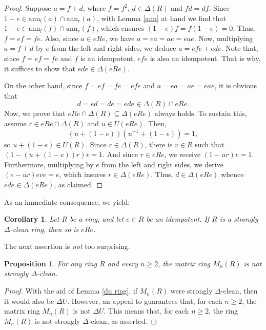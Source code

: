 \documentclass[12pt]{amsart}
\newtheorem{proposition}[theorem]{Proposition}
\newtheorem{corollary}[theorem]{Corollary}
\theoremstyle{definition}
\begin{document}
\begin{proof}
Suppose $a = f + d$, where $f = f^2$, $d \in \Delta(R)$ and $fd = df$. Since $1 - e \in \text{ann}_l(a) \cap \text{ann}_r(a)$, with Lemma \ref{ann} at hand we find that $1 - e \in \text{ann}_l(f) \cap \text{ann}_r(f)$, which ensures $(1 - e)f = f(1 - e) = 0$. Thus, $f = ef = fe$. Also, since $a \in eRe$, we have $a = ea = ae = eae$. Now, multiplying $a = f + d$ by $e$ from the left and right sides, we deduce $a = efe + ede$. Note that, since $f = ef = fe$ and $f$ is an idempotent, $efe$ is also an idempotent. That is why, it suffices to show that $ede \in \Delta(eRe)$.

On the other hand, since $f = ef = fe = efe$ and $a = ea = ae = eae$, it is obvious that $$d = ed = de = ede \in \Delta(R) \cap eRe.$$ Now, we prove that $eRe \cap \Delta(R) \subseteq \Delta(eRe)$ always holds. To sustain this, assume $r \in eRe \cap \Delta(R)$ and $u \in U(eRe)$. Then, $$(u + (1 - e))(u^{-1} + (1 - e)) = 1,$$ so $u + (1 - e) \in U(R)$. Since $r \in \Delta(R)$, there is $v \in R$ such that $(1 - (u + (1 - e))r)v = 1$. And since $r \in eRe$, we receive $(1 - ur)v = 1$. Furthermore, multiplying by $e$ from the left and right sides, we derive $(e - ur)eve = e$, which insures $r \in \Delta(eRe)$. Thus, $d \in \Delta(eRe)$ whence $ede \in \Delta(eRe)$, as claimed.
\end{proof}

As an immediate consequence, we yield:

\begin{corollary}\label{corner ring}
Let $R$ be a ring, and let $e \in R$ be an idempotent. If $R$ is a strongly $\Delta$-clean ring, then so is $eRe$.
\end{corollary}

The next assertion is {\it not} too surprising.

\begin{proposition}\label{2.2}
For any ring $R$ and every $n \geq 2$, the matrix ring $M_n(R)$ is not strongly $\Delta$-clean.
\end{proposition}

\begin{proof}
With the aid of Lemma \ref{du ring}, if $M_n(R)$ were strongly $\Delta$-clean, then it would also be $\Delta U$. However, an appeal to \cite[Theorem 2.5]{kkqt} guarantees that, for each $n \geq 2$, the matrix ring $M_n(R)$ is not $\Delta U$. This means that, for each $n \geq 2$, the ring $M_n(R)$ is not strongly $\Delta$-clean, as asserted.
\end{proof}
\end{document}
